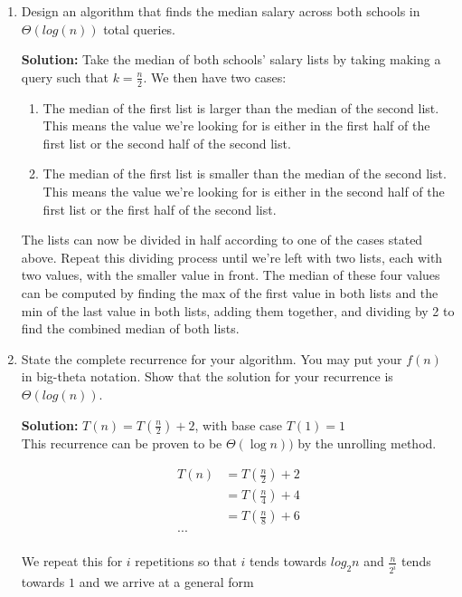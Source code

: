 \documentclass[10pt]{article}
\begin{document}
\begin{enumerate}
    \item Design an algorithm that finds the median salary across both schools in $\Theta(log(n))$ total queries.
    
    \textbf{Solution: }
    Take the median of both schools' salary lists by taking making a query such that $k = \frac{n}{2}$. We then have two cases:
    \begin{enumerate}
        \item The median of the first list is larger than the median of the second list. This means the value we're looking for is either in the first half of the first list or the second half of the second list.
        \item The median of the first list is smaller than the median of the second list. This means the value we're looking for is either in the second half of the first list or the first half of the second list.
    \end{enumerate}
    The lists can now be divided in half according to one of the cases stated above. Repeat this dividing process until we're left with two lists, each with two values, with the smaller value in front. The median of these four values can be computed by finding the max of the first value in both lists and the min of the last value in both lists, adding them together, and dividing by 2 to find the combined median of both lists.
    
    \item State the complete recurrence for your algorithm. You may put your $f(n)$ in big-theta notation. Show that the solution for your recurrence is $\Theta(log(n))$.
    
    \textbf{Solution: }
    $T(n) = T(\frac{n}{2}) + 2$, with base case $T(1) = 1$  \\
    This recurrence can be proven to be $\Theta(\log n))$ by the unrolling method.
    
    	\begin{align*}
    	T(n) &= T(\frac{n}{2}) + 2 \\
    	&= T(\frac{n}{4}) + 4 \\
    	&= T(\frac{n}{8}) + 6 \\
    	... \\
    	\end{align*}
    	
    	We repeat this for $i$ repetitions so that $i$ tends towards $log_2n$ and $\frac{n}{2^i}$ tends towards $1$ and we arrive at a general form
    	

\end{enumerate}
\end{document}
